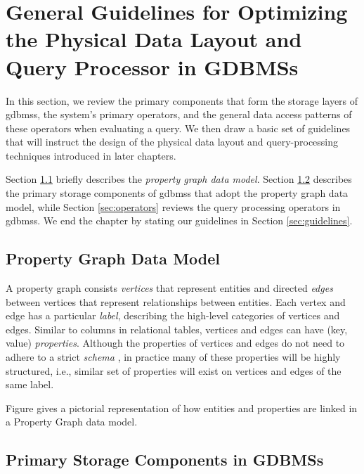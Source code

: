 \chapter{General Guidelines for Optimizing the Physical Data Layout and Query Processor in GDBMSs}
\label{c:guidelines}

In this section, we review the primary components that form the storage layers of \gls{gdbms}s, the system's primary operators, and the general data access patterns of these operators when evaluating a query. We then draw a basic set of guidelines that will instruct the design of the physical data layout and query-processing techniques introduced in later chapters.

Section \ref{sec:property-graph-data-model} briefly describes the \emph{property graph data model}. Section \ref{sec:storage-components} describes the primary storage components of \gls{gdbms}s that adopt the property graph data model, while Section \ref{sec:operators} reviews the query processing operators in \gls{gdbms}s. We end the chapter by stating our guidelines in Section \ref{sec:guidelines}.

\section{Property Graph Data Model}
\label{sec:property-graph-data-model}

A property graph consists \emph{vertices} that represent entities and directed \emph{edges} between vertices that represent relationships between entities. Each vertex and edge has a particular \emph{label}, describing the high-level categories of vertices and edges. Similar to columns in relational tables, vertices and edges can have (key, value) \emph{properties}. Although the properties of vertices and edges do not need to adhere to a strict \emph{schema }, in practice many of these properties will be highly structured, i.e., similar set of properties will exist on vertices and edges of the same label.

Figure \cite{property} gives a pictorial representation of how entities and properties are linked in a Property Graph data model.

\section{Primary Storage Components in GDBMSs}
\label{sec:storage-components}

